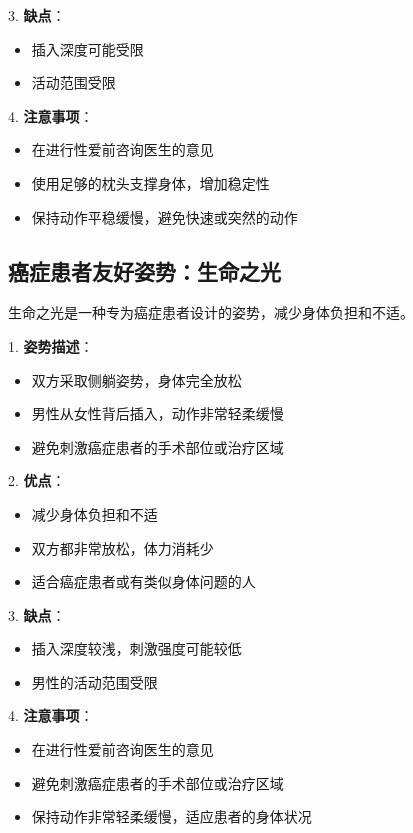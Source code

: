 \documentclass[12pt,UTF8]{ctexbook}
\begin{document}
3. \textbf{缺点}：
  \begin{itemize}
  \item 插入深度可能受限
  \item 活动范围受限
  \end{itemize}

4. \textbf{注意事项}：
  \begin{itemize}
  \item 在进行性爱前咨询医生的意见
  \item 使用足够的枕头支撑身体，增加稳定性
  \item 保持动作平稳缓慢，避免快速或突然的动作
  \end{itemize}

\subsection{癌症患者友好姿势：生命之光}

生命之光是一种专为癌症患者设计的姿势，减少身体负担和不适。

1. \textbf{姿势描述}：
  \begin{itemize}
  \item 双方采取侧躺姿势，身体完全放松
  \item 男性从女性背后插入，动作非常轻柔缓慢
  \item 避免刺激癌症患者的手术部位或治疗区域
  \end{itemize}

2. \textbf{优点}：
  \begin{itemize}
  \item 减少身体负担和不适
  \item 双方都非常放松，体力消耗少
  \item 适合癌症患者或有类似身体问题的人
  \end{itemize}

3. \textbf{缺点}：
  \begin{itemize}
  \item 插入深度较浅，刺激强度可能较低
  \item 男性的活动范围受限
  \end{itemize}

4. \textbf{注意事项}：
  \begin{itemize}
  \item 在进行性爱前咨询医生的意见
  \item 避免刺激癌症患者的手术部位或治疗区域
  \item 保持动作非常轻柔缓慢，适应患者的身体状况
  \end{itemize}
\end{document}
